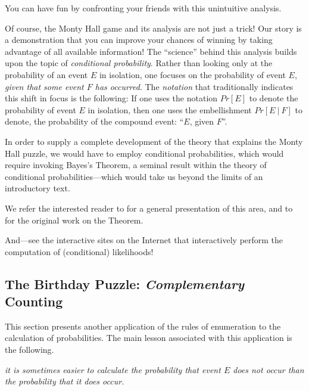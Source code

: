 \smallskip

You can have fun by confronting your friends with this unintuitive analysis.

\medskip

 

Of course, the Monty Hall game and its analysis are not just a trick!  Our story is a demonstration that you can improve your chances of winning by taking advantage of all available information!  The ``science'' behind this analysis builds upon the topic of {\em conditional probability}.  Rather than looking only at the probability of an event $E$ in isolation, one focuses on the probability of event $E$, {\em given that some event $F$ has occurred}.  The {\em notation} that traditionally indicates this shift in focus is the following: If one uses the notation $Pr[E]$ to denote the probability of event $E$ in isolation, then one uses the embellishment $Pr[E \ | \ F]$ to denote, the probability of the compound event: ``$E$, given $F$''.

\medskip

In order to supply a complete development of the theory that explains the Monty Hall puzzle, we would have to employ conditional probabilities, which would require invoking Bayes's Theorem, a seminal result within the theory of conditional probabilities---which would take us beyond the limits of an introductory text.

\smallskip

We refer the interested reader to \cite{Lee12} for a general presentation of this area, and to \cite{Bayes} for the original work on the Theorem.

\smallskip

And---see the interactive sites on the Internet that interactively perform the computation of (conditional) likelihoods!


\subsection{The Birthday Puzzle: {\em Complementary} Counting}
\label{sec:birthday-puzzle}

This section presents another application of the rules of enumeration to the calculation of probabilities.  The main lesson associated with this application is the following.

\smallskip

\noindent
{\em it is sometimes easier to calculate the probability that event $E$ {\em does not} occur than the probability that it {\em does} occur.}  

